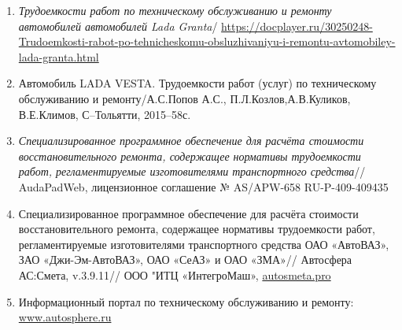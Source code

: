 \begin{enumerate}
%
\item 
\emph{Трудоемкости работ по техническому обслуживанию и ремонту автомобилей автомобилей Lada  Granta}/   \url{https://docplayer.ru/30250248-Trudoemkosti-rabot-po-tehnicheskomu-obsluzhivaniyu-i-remontu-avtomobiley-lada-granta.html}
%
\item 
Автомобиль LADA VESTA. Трудоемкости работ (услуг) по техническому обслуживанию и ремонту/А.С.Попов А.С., П.Л.Козлов,А.В.Куликов, В.Е.Климов, С--Тольятти, 2015--58с.
%
\item
\emph{Специализированное программное обеспечение для расчёта стоимости  восстановительного ремонта, содержащее нормативы трудоемкости работ, регламентируемые изготовителями транспортного средства}//   AudaPadWeb, лицензионное соглашение № AS/APW-658  RU-P-409-409435
%
%
%
\item
{Специализированное программное обеспечение для расчёта стоимости  восстановительного ремонта, содержащее нормативы трудоемкости работ, регламентируемые изготовителями транспортного средства ОАО «АвтоВАЗ», ЗАО «Джи-Эм-АвтоВАЗ», ОАО «СеАЗ» и ОАО «ЗМА»}//   Автосфера АС:Смета, v.3.9.11// ООО "ИТЦ «ИнтегроМаш», \url{autosmeta.pro}
%
%
%
\item Информационный портал по техническому обслуживанию и ремонту:\\ \url{www.autosphere.ru}

\end{enumerate}
